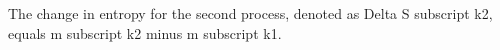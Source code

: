 The change in entropy for the second process, denoted as Delta S subscript k2, equals m subscript k2 minus m subscript k1.